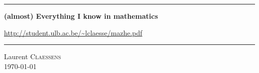 
\thispagestyle{empty}
\begin{center}
  \begin{minipage}{15cm}
    \hrule\par
    \vspace{2mm}
    \begin{center}
    \Huge \bfseries (almost) Everything I know in mathematics \par
    \normalsize
    \url{http://student.ulb.ac.be/~lclaesse/mazhe.pdf}
    \end{center}
    \hrule\par
  \end{minipage}
\end{center}

\vspace{2cm}

\begin{center}
    Laurent \textsc{Claessens}\\
    \today\\
    \texttt{\GitCommitHexsha}\\
\end{center}

\vfill

\LogoEtLicence
\clearpage


